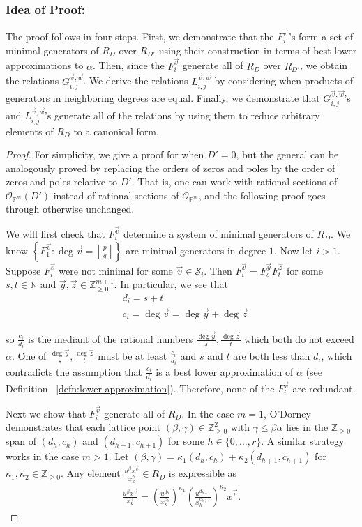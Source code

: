 \documentclass{amsart}
\theoremstyle{plain}
\theoremstyle{definition}
\theoremstyle{remark}
\numberwithin{equation}{section}
\newcommand\sssec{\subsubsection}
\newcommand\bn{{\mathbb N}}
\newcommand\bp{{\mathbb P}}
\newcommand\bz{{\mathbb Z}}
\newcommand\mss{\mathscr{S}}
\begin{document}
\sssec*{Idea of Proof:}
The proof follows in four steps. First, we demonstrate that
the $F_{i}^{\vec{v}}$'s form a set of minimal generators of $R_D$
over $R_{D'}$ using their construction in terms of best lower
approximations to $\alpha$. Then, since the $F_{i}^{\vec{v}}$ generate
all of $R_D$ over $R_{D'}$, we obtain the
relations $G_{i, j}^{\vec{v}, \vec{w}}$.
We derive the relations
$L_{i, j}^{\vec{v}, \vec{w}}$ by considering when products of
generators in neighboring degrees are equal. Finally, we demonstrate
that $G_{i, j}^{\vec{v}, \vec{w}}$'s and $L_{i, j}^{\vec{v}, \vec{w}}$'s
generate all of the relations by using them to reduce arbitrary
elements of
$R_D$ to a canonical form.

\begin{proof}
For simplicity, we give a proof for when $D' = 0$, but the general
can be analogously proved by replacing the orders of zeros and poles
by the order of zeros and poles relative to $D'$. That is,
one can work with rational sections of $\mathscr O_{\bp^m}(D')$
instead of rational sections of $\mathscr O_{\bp^m}$,
and the following proof goes through otherwise unchanged.

We will first check that $F^{\vec v}_i$ determine a system of minimal
generators of $R_D$. We know $\left\{F_{1}^{\vec{v}} \colon \deg \vec{v} =
\left\lfloor
\frac{p}{q} \right\rfloor \right\}$ are minimal generators in
degree $1$. Now let $i > 1$. Suppose $F_i^{\vec{v}}$ were not
minimal for some $\vec{v} \in \mss_i$. Then $F_i^{\vec{v}} =
F_{s}^{\vec{y}} F_{t}^{\vec{z}}$ for some $s, t \in \bn$ and
$\vec{y}, \vec{z} \in \bz_{ \geq 0}^{m + 1}$. In particular, we see
that 
\begin{align*}
	&d_i = s + t \\
	&c_i = \deg \vec{v} = \deg \vec{y} + \deg \vec{z}
\end{align*}

\noindent
so $\frac{c_i}{d_i}$ is the mediant of the rational numbers
$\frac{\deg \vec{y}}{s}, \frac{\deg \vec{z}}{t}$ which both
do not exceed $\alpha$. One of $\frac{\deg \vec{y}}{s},
\frac{\deg \vec{z}}{t}$ must be at least $\frac{c_i}{d_i}$
and $s$ and $t$ are both less than $d_i$, which contradicts the assumption that
$\frac{c_i}{d_i}$ is a best lower approximation of $\alpha$
(see Definition ~\ref{defn:lower-approximation}). Therefore, none of the $F_i^{\vec v}$ are redundant.

Next we show that $F^{\vec v}_i$ generate all of $R_D$. In the case $m = 1$, O'Dorney \cite[Theorem 6]
{dorney:canonical} demonstrates that each lattice point $(\beta, \gamma) \in
\bz_{\geq 0}^2$ with $\gamma \leq \beta \alpha$ lies in the $\bz_{\geq 0}$ span
of $(d_h, c_h)$ and $(d_{h + 1}, c_{h + 1})$ for
some $h \in \{0, \ldots, r\}$. A similar strategy works in the case $m > 1$. Let $(\beta, \gamma) = \kappa_1
(d_h, c_h) + \kappa_2 (d_{h + 1}, c_{h + 1})$ for $\kappa_1, \kappa_2 \in
\bz_{\geq 0}$. Any element $\frac{u^{\beta}
x^{\vec{v}}} {x_k^{ \gamma}} \in R_D$ is expressible as
\begin{align*}
	\frac{u^{\beta} x^{\vec{v}}} {x_k^{\gamma}} = \left(\frac{u^{d_h}}
	{x_k^{c_h}}\right)^{\kappa_1} \left(\frac{u^{d_{h + 1}}}
	{x_k^{c_{h + 1}}}\right)^{\kappa_2} x^{\vec{v}}.
\end{align*}


\end{proof}
\end{document}
